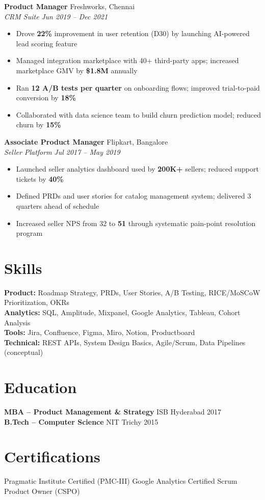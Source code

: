 \documentclass[10pt,a4paper]{article}
\newcommand{\metric}[1]{\textbf{\color{accent}#1}}
\begin{document}
\textbf{Product Manager} \hfill Freshworks, Chennai\\
\textit{CRM Suite} \hfill \textit{Jun 2019 -- Dec 2021}
\begin{itemize}
  \item Drove \metric{22\%} improvement in user retention (D30) by launching AI-powered lead scoring feature
  \item Managed integration marketplace with 40+ third-party apps; increased marketplace GMV by \metric{\$1.8M} annually
  \item Ran \metric{12 A/B tests per quarter} on onboarding flows; improved trial-to-paid conversion by \metric{18\%}
  \item Collaborated with data science team to build churn prediction model; reduced churn by \metric{15\%}
\end{itemize}

\textbf{Associate Product Manager} \hfill Flipkart, Bangalore\\
\textit{Seller Platform} \hfill \textit{Jul 2017 -- May 2019}
\begin{itemize}
  \item Launched seller analytics dashboard used by \metric{200K+} sellers; reduced support tickets by \metric{40\%}
  \item Defined PRDs and user stories for catalog management system; delivered 3 quarters ahead of schedule
  \item Increased seller NPS from 32 to \metric{51} through systematic pain-point resolution program
\end{itemize}

\section{Skills}
\textbf{Product:} Roadmap Strategy, PRDs, User Stories, A/B Testing, RICE/MoSCoW Prioritization, OKRs\\
\textbf{Analytics:} SQL, Amplitude, Mixpanel, Google Analytics, Tableau, Cohort Analysis\\
\textbf{Tools:} Jira, Confluence, Figma, Miro, Notion, Productboard\\
\textbf{Technical:} REST APIs, System Design Basics, Agile/Scrum, Data Pipelines (conceptual)

\section{Education}
\textbf{MBA -- Product Management \& Strategy} \hfill ISB Hyderabad \hfill 2017\\
\textbf{B.Tech -- Computer Science} \hfill NIT Trichy \hfill 2015

\section{Certifications}
Pragmatic Institute Certified (PMC-III) \quad\textbar\quad Google Analytics Certified \quad\textbar\quad Scrum Product Owner (CSPO)
\end{document}
